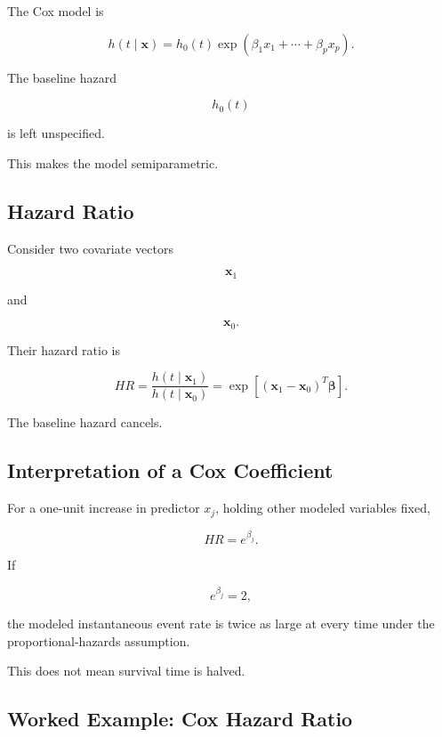 The Cox model is

\[
\boxed{
h
(
t\mid\mathbf{x}
)
=
h_0(t)
\exp
(
\beta_1x_1
+
\cdots
+
\beta_px_p
).
}
\]

The baseline hazard

\[
h_0(t)
\]

is left unspecified.

This makes the model semiparametric.

\subsection{Hazard Ratio}
\label{subsec:hazard-ratio}

Consider two covariate vectors

\[
\mathbf{x}_1
\]

and

\[
\mathbf{x}_0.
\]

Their hazard ratio is

\[
\boxed{
HR
=
\frac{
h(t\mid\mathbf{x}_1)
}{
h(t\mid\mathbf{x}_0)
}
=
\exp
\left[
(
\mathbf{x}_1-\mathbf{x}_0
)^T
\boldsymbol{\beta}
\right].
}
\]

The baseline hazard cancels.

\subsection{Interpretation of a Cox Coefficient}
\label{subsec:cox-coefficient-interpretation}

For a one-unit increase in predictor \(x_j\), holding other modeled
variables fixed,

\[
\boxed{
HR
=
e^{\beta_j}.
}
\]

If

\[
e^{\beta_j}=2,
\]

the modeled instantaneous event rate is twice as large at every time
under the proportional-hazards assumption.

This does not mean survival time is halved.

\subsection{Worked Example: Cox Hazard Ratio}
\label{subsec:worked-cox-hazard-ratio}

